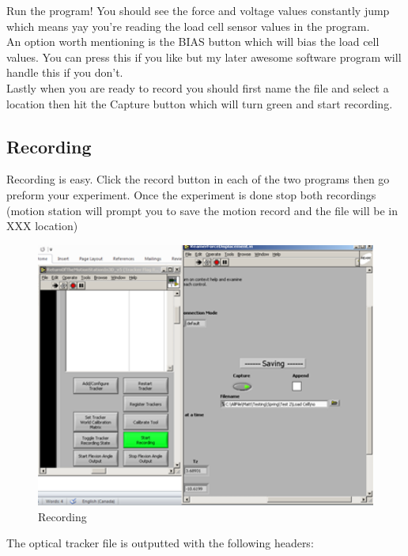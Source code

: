 \documentclass[pdftex,11pt,letterpaper]{article}
\begin{document}
Run the program! You should see the force and voltage values constantly jump which means yay you’re reading the load cell sensor values in the program. \\

An option worth mentioning is the BIAS button which will bias the load cell values. You can press this if you like but my later awesome software program will handle this if you don’t. \\
 
Lastly when you are ready to record you should first name the file and select a location then hit the Capture button which will turn green and start recording. \\

\subsection{Recording}

Recording is easy. Click the record button in each of the two programs then go preform your experiment. Once the experiment is done stop both recordings (motion station will prompt you to save the motion record and the file will be in XXX location) \\

\begin{figure}[ht!]
\centering
\includegraphics[width=150mm]{./images/record}
\caption{Recording}
\end{figure}

The optical tracker file is outputted with the following headers:
\end{document}
